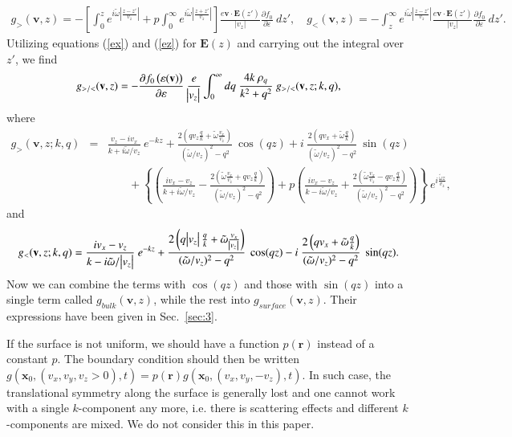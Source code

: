 \documentclass[aps,reprint]{revtex4-1}
\begin{document}
 \begin{widetext}
 \begin{eqnarray}
g_{>}(\mathbf{v},z) = - \left[\int^{z}_0 e^{i\tilde{\omega}|\frac{z-z'}{v_z}|}
	     + p\int^{\infty}_0
	     e^{i\tilde{\omega}|\frac{z+z'}{v_z}|}\right]
\frac{e\mathbf{v}\cdot\mathbf{E}(z')}{|v_z|}\frac{\partial f_0}{\partial
 \varepsilon}~dz', \quad
g_{<}(\mathbf{v},z) = - \int^{\infty}_z e^{i\tilde{\omega}|\frac{z-z'}{v_z}|} \frac{e\mathbf{v}\cdot\mathbf{E}(z')}{|v_z|}\frac{\partial f_0}{\partial
 \varepsilon}~dz'.
\end{eqnarray}
Utilizing equations (\ref{ex}) and (\ref{ez}) for $\mathbf{E}(z)$ and carrying out the integral over $z'$, we find
\begin{equation}
g_{>/<}(\mathbf{v},z) = -\frac{\partial f_0\left(\varepsilon(\mathbf{v})\right)}{\partial \varepsilon}~\frac{e}{\abs{v_z}} \int^{\infty}_0 dq~\frac{4 k ~ \rho_q}{k^2+q^2} ~
g_{>/<}(\mathbf{v},z;k,q),
\end{equation}
where
\begin{eqnarray}
g_>(\mathbf{v},z;k,q) &=& \frac{v_z-iv_x}{k+i\tilde{\omega}/v_z}~e^{-kz} + \frac{2\left(qv_z\frac{q}{k}+\tilde{\omega}\frac{v_x}{v_z}\right)}{(\tilde{\omega}/v_z)^2-q^2}~\cos(qz) + i~\frac{2\left(qv_x+\tilde{\omega}\frac{q}{k}\right)}{(\tilde{\omega}/v_z)^2-q^2}~\sin(qz) \nonumber\\ 
&~& ~~~~ \quad + \left\{\left(\frac{iv_x-v_z}{k+i\tilde{\omega}/v_z} - \frac{2\left(\tilde{\omega}\frac{v_x}{v_z}+qv_z\frac{q}{k}\right)}{(\tilde{\omega}/v_z)^2-q^2}\right)+p\left(\frac{iv_x-v_z}{k-i\tilde{\omega}/v_z}+\frac{2\left(\tilde{\omega}\frac{v_x}{v_z}-qv_z\frac{q}{k}\right)}{(\tilde{\omega}/v_z)^2-q^2}\right)\right\}~e^{i\frac{\tilde{\omega}z}{v_z}},
\end{eqnarray}
and 
\begin{equation}
g_<(\mathbf{v},z;k,q) = \frac{iv_x-v_z}{k-i\tilde{\omega}/\abs{v_z}}~e^{-kz}+ \frac{2\left(q\abs{v_z}\frac{q}{k}+\tilde{\omega}\frac{v_x}{\abs{v_z}}\right)}{(\tilde{\omega}/v_z)^2-q^2}~\cos(qz) - i~\frac{2\left(qv_x+\tilde{\omega}\frac{q}{k}\right)}{(\tilde{\omega}/v_z)^2-q^2} ~ \sin(qz). \label{11}
\end{equation}
Now we can combine the terms with $\cos(qz)$ and those with $\sin(qz)$ into a single term called $g_{bulk}(\mathbf{v},z)$, while the rest into $g_{surface}(\mathbf{v},z)$. Their expressions have been given in Sec.~\ref{sec:3}. 

If the surface is not uniform, we should have a function $p(\mathbf{r})$ instead of a constant $p$. The boundary condition should then be written $g(\mathbf{x}_0,(v_x,v_y,v_z>0),t) = p(\mathbf{r}) g(\mathbf{x}_0,(v_x,v_y,-v_z),t)$. In such case, the translational symmetry along the surface is generally lost and one cannot work with a single $k$-component any more, i.e. there is scattering effects and different $k$-components are mixed. We do not consider this in this paper.  


\end{widetext}
\end{document}
